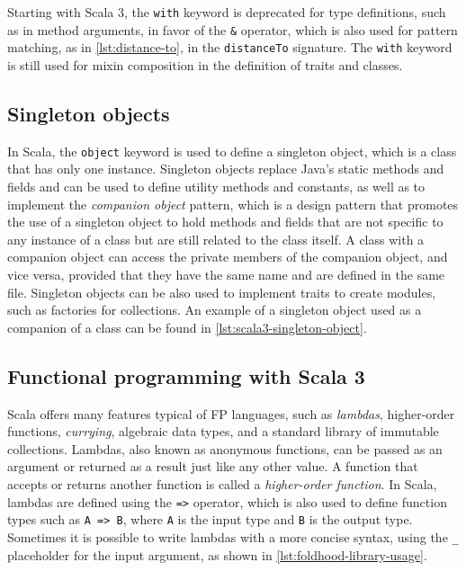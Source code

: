 Starting with Scala 3, the \texttt{with} keyword is deprecated for type definitions, such as in method arguments, in favor of the \texttt{\&} operator, which is also used for pattern matching, as in \cref{lst:distance-to}, in the \texttt{distanceTo} signature.
%
The \texttt{with} keyword is still used for mixin composition in the definition of traits and classes.


\subsection{Singleton objects} \label{chap:background->sec:scala3->subsec:singleton-objects}

In Scala, the \texttt{object} keyword is used to define a singleton object, which is a class that has only one instance.
%
Singleton objects replace Java's static methods and fields and can be used to define utility methods and constants, as well as to implement the \textit{companion object} pattern, which is a design pattern that promotes the use of a singleton object to hold methods and fields that are not specific to any instance of a class but are still related to the class itself.
%
A class with a companion object can access the private members of the companion object, and vice versa, provided that they have the same name and are defined in the same file.
%
Singleton objects can be also used to implement traits to create modules, such as factories for collections.
%
An example of a singleton object used as a companion of a class can be found in \cref{lst:scala3-singleton-object}.




\subsection{Functional programming with Scala 3} \label{chap:background->sec:scala3->subsec:functional-programming}

Scala offers many features typical of \ac{FP} languages, such as \textit{lambdas}, higher-order functions, \textit{currying}, algebraic data types, and a standard library of immutable collections.
%
Lambdas, also known as anonymous functions, can be passed as an argument or returned as a result just like any other value.
%
A function that accepts or returns another function is called a \textit{higher-order function}.
%
In Scala, lambdas are defined using the \texttt{=>} operator, which is also used to define function types such as \texttt{A => B}, where \texttt{A} is the input type and \texttt{B} is the output type.
%
Sometimes it is possible to write lambdas with a more concise syntax, using the \texttt{\_} placeholder for the input argument, as shown in \cref{lst:foldhood-library-usage}.

